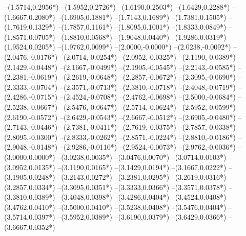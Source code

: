 {	--(1.5714,{0.2956*\yskala})
	--(1.5952,{0.2726*\yskala})
	--(1.6190,{0.2503*\yskala})
	--(1.6429,{0.2288*\yskala})
	--(1.6667,{0.2080*\yskala})
	--(1.6905,{0.1881*\yskala})
	--(1.7143,{0.1689*\yskala})
	--(1.7381,{0.1505*\yskala})
	--(1.7619,{0.1329*\yskala})
	--(1.7857,{0.1161*\yskala})
	--(1.8095,{0.1001*\yskala})
	--(1.8333,{0.0849*\yskala})
	--(1.8571,{0.0705*\yskala})
	--(1.8810,{0.0568*\yskala})
	--(1.9048,{0.0440*\yskala})
	--(1.9286,{0.0319*\yskala})
	--(1.9524,{0.0205*\yskala})
	--(1.9762,{0.0099*\yskala})
	--(2.0000,{-0.0000*\yskala})
	--(2.0238,{-0.0092*\yskala})
	--(2.0476,{-0.0176*\yskala})
	--(2.0714,{-0.0254*\yskala})
	--(2.0952,{-0.0325*\yskala})
	--(2.1190,{-0.0389*\yskala})
	--(2.1429,{-0.0448*\yskala})
	--(2.1667,{-0.0499*\yskala})
	--(2.1905,{-0.0545*\yskala})
	--(2.2143,{-0.0585*\yskala})
	--(2.2381,{-0.0619*\yskala})
	--(2.2619,{-0.0648*\yskala})
	--(2.2857,{-0.0672*\yskala})
	--(2.3095,{-0.0690*\yskala})
	--(2.3333,{-0.0704*\yskala})
	--(2.3571,{-0.0713*\yskala})
	--(2.3810,{-0.0718*\yskala})
	--(2.4048,{-0.0719*\yskala})
	--(2.4286,{-0.0715*\yskala})
	--(2.4524,{-0.0708*\yskala})
	--(2.4762,{-0.0698*\yskala})
	--(2.5000,{-0.0684*\yskala})
	--(2.5238,{-0.0667*\yskala})
	--(2.5476,{-0.0647*\yskala})
	--(2.5714,{-0.0624*\yskala})
	--(2.5952,{-0.0599*\yskala})
	--(2.6190,{-0.0572*\yskala})
	--(2.6429,{-0.0543*\yskala})
	--(2.6667,{-0.0512*\yskala})
	--(2.6905,{-0.0480*\yskala})
	--(2.7143,{-0.0446*\yskala})
	--(2.7381,{-0.0411*\yskala})
	--(2.7619,{-0.0375*\yskala})
	--(2.7857,{-0.0338*\yskala})
	--(2.8095,{-0.0300*\yskala})
	--(2.8333,{-0.0262*\yskala})
	--(2.8571,{-0.0224*\yskala})
	--(2.8810,{-0.0186*\yskala})
	--(2.9048,{-0.0148*\yskala})
	--(2.9286,{-0.0110*\yskala})
	--(2.9524,{-0.0073*\yskala})
	--(2.9762,{-0.0036*\yskala})
	--(3.0000,{0.0000*\yskala})
	--(3.0238,{0.0035*\yskala})
	--(3.0476,{0.0070*\yskala})
	--(3.0714,{0.0103*\yskala})
	--(3.0952,{0.0135*\yskala})
	--(3.1190,{0.0165*\yskala})
	--(3.1429,{0.0194*\yskala})
	--(3.1667,{0.0222*\yskala})
	--(3.1905,{0.0248*\yskala})
	--(3.2143,{0.0272*\yskala})
	--(3.2381,{0.0295*\yskala})
	--(3.2619,{0.0316*\yskala})
	--(3.2857,{0.0334*\yskala})
	--(3.3095,{0.0351*\yskala})
	--(3.3333,{0.0366*\yskala})
	--(3.3571,{0.0378*\yskala})
	--(3.3810,{0.0389*\yskala})
	--(3.4048,{0.0398*\yskala})
	--(3.4286,{0.0404*\yskala})
	--(3.4524,{0.0408*\yskala})
	--(3.4762,{0.0410*\yskala})
	--(3.5000,{0.0410*\yskala})
	--(3.5238,{0.0408*\yskala})
	--(3.5476,{0.0404*\yskala})
	--(3.5714,{0.0397*\yskala})
	--(3.5952,{0.0389*\yskala})
	--(3.6190,{0.0379*\yskala})
	--(3.6429,{0.0366*\yskala})
	--(3.6667,{0.0352*\yskala})
}

